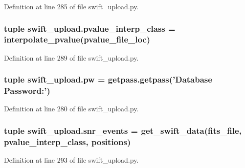 Definition at line 285 of file swift\-\_\-upload.\-py.

\hypertarget{namespaceswift__upload_a47786733b71afff4100ce30a5522235e}{
\subsubsection[{pvalue\-\_\-interp\-\_\-class}]{\setlength{\rightskip}{0pt plus 5cm}tuple swift\-\_\-upload.\-pvalue\-\_\-interp\-\_\-class = {\bf interpolate\-\_\-pvalue}({\bf pvalue\-\_\-file\-\_\-loc})}}\label{namespaceswift__upload_a47786733b71afff4100ce30a5522235e}


Definition at line 289 of file swift\-\_\-upload.\-py.

\hypertarget{namespaceswift__upload_ae6ff833c36ee2cf47e509afe217a0617}{
\subsubsection[{pw}]{\setlength{\rightskip}{0pt plus 5cm}tuple swift\-\_\-upload.\-pw = getpass.\-getpass('Database Password\-:')}}\label{namespaceswift__upload_ae6ff833c36ee2cf47e509afe217a0617}


Definition at line 280 of file swift\-\_\-upload.\-py.

\hypertarget{namespaceswift__upload_aa7b8b09b55bc451f3bf4383f952dbe80}{
\subsubsection[{snr\-\_\-events}]{\setlength{\rightskip}{0pt plus 5cm}tuple swift\-\_\-upload.\-snr\-\_\-events = {\bf get\-\_\-swift\-\_\-data}(fits\-\_\-file, {\bf pvalue\-\_\-interp\-\_\-class}, {\bf positions})}}\label{namespaceswift__upload_aa7b8b09b55bc451f3bf4383f952dbe80}


Definition at line 293 of file swift\-\_\-upload.\-py.

